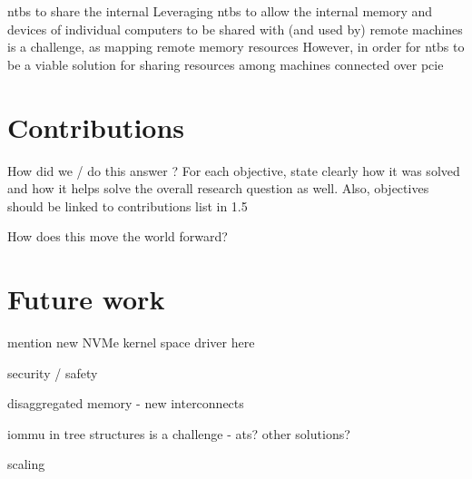 \glspl{ntb} to share the internal
Leveraging \glspl{ntb} to allow the internal memory and devices of individual computers to be shared with (and used by) remote machines is a challenge, as mapping remote memory resources 
%
However, in order for \glspl{ntb} to be a viable solution for sharing resources among machines connected over \gls{pcie}





\section{Contributions}\label{sec:concl}

How did we / do this answer ?
For each objective, state clearly how it was solved and how it helps solve the overall research question as well.
%
Also, objectives should be linked to contributions list in 1.5

How does this move the world forward?

\section{Future work}\label{sec:fw}

mention new NVMe kernel space driver here

security / safety

disaggregated memory - new interconnects

iommu in tree structures is a challenge - ats? other solutions?


scaling





%
%
